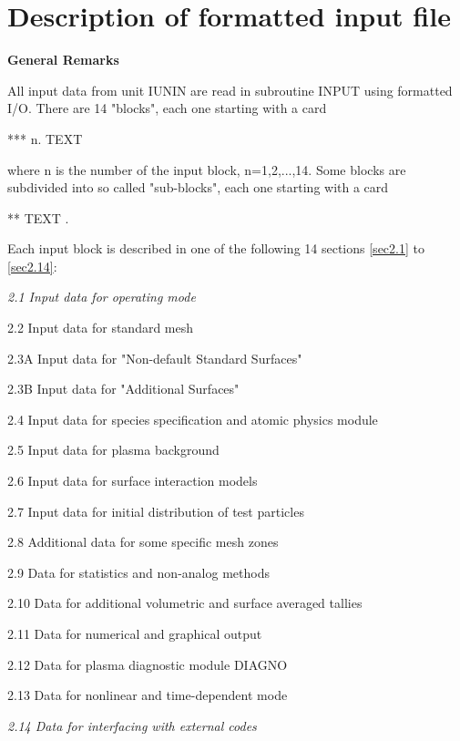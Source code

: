 \chapter{Description of formatted input file} \label{sec2}

\medskip

\noindent

{\bf General Remarks}

\medskip

\noindent

All input data from unit IUNIN are read in subroutine  INPUT using
formatted I/O. There are 14 "blocks", each one starting with a card

\medskip

*** n. TEXT

\medskip

where n is the number of the input block, n=1,2,...,14. Some blocks
are subdivided into so called "sub-blocks", each one starting with a
card

\medskip

** TEXT .

\medskip

Each input block is described in one of the
following 14 sections \ref{sec2.1} to \ref{sec2.14}:

\medskip

{\sl 2.1  Input data for operating mode

2.2  Input data for standard mesh

2.3A Input data for "Non-default Standard Surfaces"

2.3B Input data for "Additional Surfaces"

2.4  Input data for species specification and atomic physics module

2.5  Input data for plasma background

2.6  Input data for surface interaction models

2.7  Input data for initial distribution of test particles

2.8  Additional data for some specific mesh zones

2.9  Data for statistics and non-analog methods

2.10 Data for additional volumetric and surface averaged tallies

2.11 Data for numerical and graphical output

2.12 Data for plasma diagnostic module DIAGNO

2.13 Data for nonlinear and time-dependent mode

\sl 2.14 Data for interfacing with external codes}
\medskip

